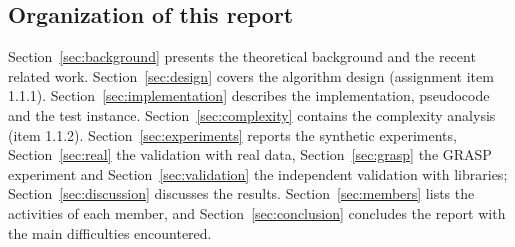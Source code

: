 \subsection{Organization of this report}

Section~\ref{sec:background} presents the theoretical background and the recent related work. Section~\ref{sec:design} covers the algorithm design (assignment item 1.1.1). Section~\ref{sec:implementation} describes the implementation, pseudocode and the test instance. Section~\ref{sec:complexity} contains the complexity analysis (item 1.1.2). Section~\ref{sec:experiments} reports the synthetic experiments, Section~\ref{sec:real} the validation with real data, Section~\ref{sec:grasp} the GRASP experiment and Section~\ref{sec:validation} the independent validation with libraries; Section~\ref{sec:discussion} discusses the results. Section~\ref{sec:members} lists the activities of each member, and Section~\ref{sec:conclusion} concludes the report with the main difficulties encountered.
